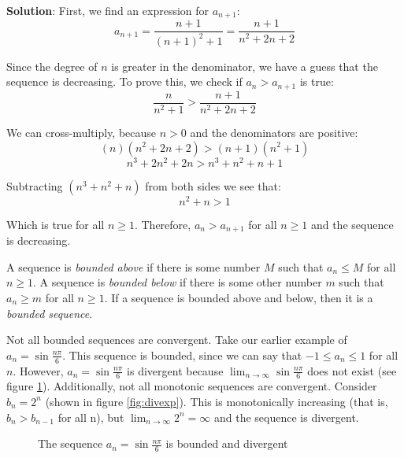 \textbf{Solution}: First, we find an expression for $a_{n+1}$:
$$a_{n + 1} = \frac{n + 1}{(n + 1)^2 + 1} = \frac{n + 1}{n^2 + 2n + 2}$$

Since the degree of $n$ is greater in the denominator, we have a guess that 
the sequence is decreasing. To prove this, we check if $a_n > a_{n+1}$ is true:
$$\frac{n}{n^2 + 1} > \frac{n + 1}{n^2 + 2n + 2}$$

We can cross-multiply, because $n > 0$ and the denominators are positive:
$$(n)(n^2 + 2n + 2) > (n+1)(n^2 + 1)$$
$$n^3 + 2n^2 + 2n > n^3 + n^2 + n + 1$$

Subtracting $(n^3 + n^2 + n)$ from both sides we see that:
$$n^2 + n > 1$$

Which is true for all $n \geq1$. Therefore, $a_n > a_{n+1}$ for all $n \geq 1$ 
and the sequence is decreasing. 

A sequence is \textit{bounded above} if there is some number $M$ such that 
$a_n \leq M$ for all $n \geq 1$. A sequence is \textit{bounded below} if 
there is some other number $m$ such that $a_n \geq m$ for all $n \geq 1$. If a 
sequence is bounded above and below, then it is a \textit{bounded sequence}. 

Not all bounded sequences are convergent. Take our earlier example of $a_n = 
\sin{\frac{n\pi}{6}}$. This sequence is bounded, since we can say that $- 1 
\leq a_n \leq 1$ for all $n$. However, $a_n = \sin{\frac{n\pi}{6}}$ is 
divergent because $\lim_{n \to \infty} \sin{\frac{n\pi}{6}}$ does not exist 
(see figure \ref{fig:divsine}). Additionally, not all monotonic sequences are 
convergent. Consider $b_n = 2^n$ (shown in figure \ref{fig:divexp}). This is 
monotonically increasing (that is, $b_n > b_{n-1}$ for all n), but $\lim_{n \to 
\infty} 2^n = \infty$ and the sequence is divergent. 

\begin{figure}
    \centering
    \caption{The sequence $a_n = \sin{\frac{n\pi}{6}}$ is bounded and divergent}
    \label{fig:divsine}
\end{figure}

